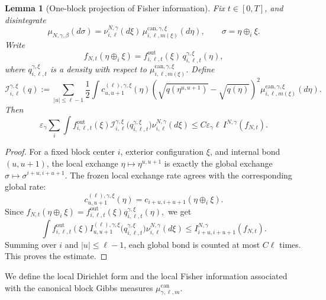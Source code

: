 \documentclass{article}
\newtheorem{lemma}{Lemma}
\begin{document}
\begin{lemma}[One-block projection of Fisher information]
\label{lem:clean-one-block-FI-projection}
Fix \(t\in[0,T]\), and disintegrate
\[
\mu_{N,\gamma,\beta}(d\sigma)
=
\nu_{i,\ell}^{N,\gamma}(d\xi)\,
\mu_{i,\ell,m(\xi)}^{\mathrm{can},\gamma,\xi}(d\eta),
\qquad
\sigma=\eta\oplus_i\xi.
\]
Write
\[
f_{N,t}(\eta\oplus_i\xi)
=
f_{i,\ell,t}^{\mathrm{out}}(\xi)\,
q_{i,\ell,t}^{\gamma,\xi}(\eta),
\]
where \(q_{i,\ell,t}^{\gamma,\xi}\) is a density with respect to
\(\mu_{i,\ell,m(\xi)}^{\mathrm{can},\gamma,\xi}\).  
Define
\[
\mathcal I_{i,\ell}^{\gamma,\xi}(q)
:=
\sum_{|u|\le\ell-1}
\frac12
\int
c_{u,u+1}^{(\ell),\gamma,\xi}(\eta)
\left(
\sqrt{q(\eta^{u,u+1})}-\sqrt{q(\eta)}
\right)^2
\mu_{i,\ell,m(\xi)}^{\mathrm{can},\gamma,\xi}(d\eta).
\]
Then
\begin{equation}\label{eq:projection-ineq-summed}
    \varepsilon_\gamma\sum_i
\int
f_{i,\ell,t}^{\mathrm{out}}(\xi)
\mathcal I_{i,\ell}^{\gamma,\xi}
\bigl(q_{i,\ell,t}^{\gamma,\xi}\bigr)
\nu_{i,\ell}^{N,\gamma}(d\xi) \le C\varepsilon_\gamma\ell\,I^{N,\gamma}(f_{N,t}).
\end{equation}
\end{lemma}

\begin{proof}
For a fixed block center \(i\), exterior configuration \(\xi\), and internal
bond \((u,u+1)\), the local exchange \(\eta\mapsto\eta^{u,u+1}\) is exactly the
global exchange \(\sigma\mapsto\sigma^{i+u,i+u+1}\).  The frozen local exchange
rate agrees with the corresponding global rate:
\[
c_{u,u+1}^{(\ell),\gamma,\xi}(\eta)
=
c_{i+u,i+u+1}(\eta\oplus_i\xi).
\]
Since
\(
f_{N,t}(\eta\oplus_i\xi)
=
f_{i,\ell,t}^{\mathrm{out}}(\xi)
q_{i,\ell,t}^{\gamma,\xi}(\eta),
\)
we get
\[
\int
f_{i,\ell,t}^{\mathrm{out}}(\xi)
I_{u,u+1}^{(\ell),\gamma,\xi}
\bigl(q_{i,\ell,t}^{\gamma,\xi}\bigr)
\nu_{i,\ell}^{N,\gamma}(d\xi)
\le
I_{i+u,i+u+1}^{N,\gamma}(f_{N,t}).
\]
Summing over \(i\) and \(|u|\le\ell-1\), each global bond is counted at most
\(C\ell\) times.  This proves the estimate.
\end{proof}




We define the local Dirichlet form and the local Fisher information associated with the canonical block Gibbs measures $\mu_{\gamma,\ell,m}^{\mathrm{can}}$.
\end{document}

